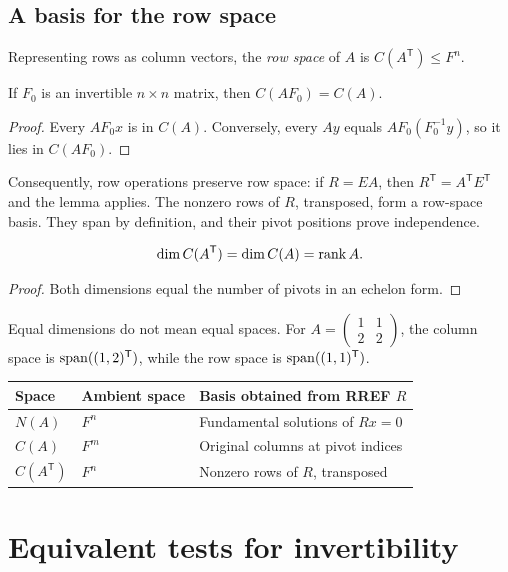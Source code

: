 \subsection{A basis for the row space}

Representing rows as column vectors, the \emph{row space} of $A$ is
$C(A^{\mathsf T})\leq F^n$.

\begin{lemma}
If $F_0$ is an invertible $n\times n$ matrix, then $C(AF_0)=C(A)$.
\end{lemma}
\begin{proof}
Every $AF_0x$ is in $C(A)$. Conversely, every $Ay$ equals
$AF_0(F_0^{-1}y)$, so it lies in $C(AF_0)$.
\end{proof}

Consequently, row operations preserve row space:
if $R=EA$, then $R^{\mathsf T}=A^{\mathsf T}E^{\mathsf T}$ and the
lemma applies. The nonzero rows of $R$, transposed, form a row-space
basis. They span by definition, and their pivot positions prove
independence.

\begin{theorem}
\[
 \dim C(A^{\mathsf T})=\dim C(A)=\operatorname{rank} A.
\]
\end{theorem}
\begin{proof}
Both dimensions equal the number of pivots in an echelon form.
\end{proof}

Equal dimensions do not mean equal spaces. For
$A=\begin{pmatrix}1&1\\2&2\end{pmatrix}$, the column space is
$\operatorname{span}((1,2)^{\mathsf T})$, while the row space is
$\operatorname{span}((1,1)^{\mathsf T})$.

\begin{center}
\begin{tabular}{lll}
\toprule
Space & Ambient space & Basis obtained from RREF $R$\\
\midrule
$N(A)$ & $F^n$ & Fundamental solutions of $Rx=0$\\
$C(A)$ & $F^m$ & Original columns at pivot indices\\
$C(A^{\mathsf T})$ & $F^n$ & Nonzero rows of $R$, transposed\\
\bottomrule
\end{tabular}
\end{center}

\section{Equivalent tests for invertibility}


